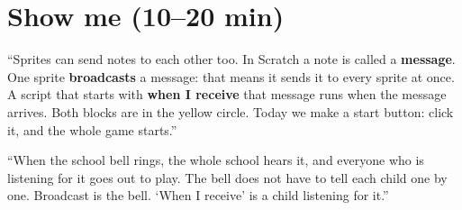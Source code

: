 \section{Show me (10--20 min)}
\begin{teacherscript}
\enquote{Sprites can send notes to each other too. In Scratch a note is called a \textbf{message}. One sprite \textbf{broadcasts} a message: that means it sends it to every sprite at once. A script that starts with \textbf{when I receive} that message runs when the message arrives. Both blocks are in the yellow  circle. Today we make a start button: click it, and the whole game starts.}
\end{teacherscript}

\begin{analogy}
\enquote{When the school bell rings, the whole school hears it, and everyone who is listening for it goes out to play. The bell does not have to tell each child one by one. Broadcast is the bell. \enquote{When I receive} is a child listening for it.}
\end{analogy}

